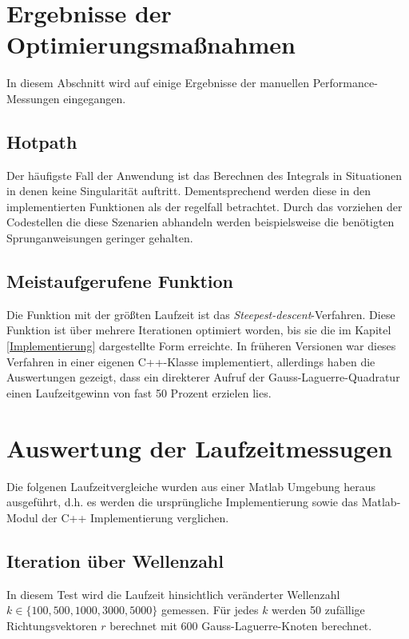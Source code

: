 \section{Ergebnisse der Optimierungsmaßnahmen}

In diesem Abschnitt wird auf einige Ergebnisse der manuellen Performance-Messungen eingegangen.

\subsection{Hotpath}

Der häufigste Fall der Anwendung ist das Berechnen des Integrals in Situationen in denen keine Singularität auftritt. 
Dementsprechend werden diese in den implementierten Funktionen als der regelfall betrachtet.
Durch das vorziehen der Codestellen die diese Szenarien abhandeln werden beispielsweise die benötigten Sprunganweisungen geringer gehalten.



\subsection{Meistaufgerufene Funktion}

Die Funktion mit der größten Laufzeit ist das \textit{Steepest-descent}-Verfahren.
Diese Funktion ist über mehrere Iterationen optimiert worden, bis sie die im Kapitel \ref{Implementierung} dargestellte Form erreichte.
In früheren Versionen war dieses Verfahren in einer eigenen C++-Klasse implementiert, allerdings haben die Auswertungen gezeigt, dass ein
direkterer Aufruf der Gauss-Laguerre-Quadratur einen Laufzeitgewinn von fast 50 Prozent erzielen lies.


\section{Auswertung der Laufzeitmessugen}

Die folgenen Laufzeitvergleiche wurden aus einer Matlab Umgebung heraus ausgeführt, d.h. es werden die ursprüngliche Implementierung sowie das Matlab-Modul der C++ Implementierung verglichen.


\subsection{Iteration über Wellenzahl}


In diesem Test wird die Laufzeit hinsichtlich veränderter Wellenzahl $k \in \{ 100, 500, 1000, 3000, 5000 \}$ gemessen.
Für jedes $k$ werden 50 zufällige Richtungsvektoren $r$ berechnet mit 600 Gauss-Laguerre-Knoten berechnet.

